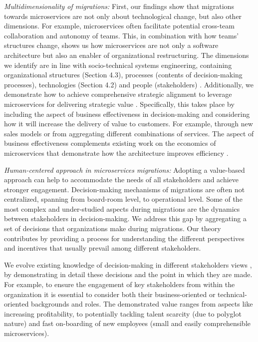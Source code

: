 \documentclass[sigconf,dvipsnames]{acmart}
\begin{document}
\emph{Multidimensionality of migrations:}
First, our findings show that migrations towards microservices are not only about technological change, but also other dimensions.
For example, microservices often facilitate potential cross-team collaboration and autonomy of teams. This, in combination with how teams' structures change, shows us how microservices are not only a software architecture but also an enabler of organizational restructuring.
The dimensions we identify are in line with socio-technical systems engineering, containing organizational structures (Section 4.3), processes (contents of decision-making processes), technologies (Section 4.2) and people (stakeholders) \cite{Baxter2011}. Additionally, we demonstrate how to achieve comprehensive strategic alignment to leverage microservices for delivering strategic value  \cite{Venkatraman1999}. Specifically, this takes place by including the aspect of business effectiveness \cite{Venkatraman1986} in decision-making and considering how it will increase the delivery of value to customers. For example, through new sales models or from aggregating different combinations of services. The aspect of business effectiveness complements existing work on the economics of microservices that demonstrate how the architecture improves efficiency \cite{singleton2016}.

\emph{Human-centered approach in microservices migrations:}
Adopting a value-based approach can help to accommodate the needs of all stakeholders and achieve stronger engagement.
Decision-making mechanisms of migrations are often not centralized, spanning from board-room level, to operational level.
Some of the most complex and under-studied aspects during migrations are the dynamics between stakeholders in decision-making.
We address this gap by aggregating a set of decisions that organizations make during migrations. Our theory contributes by providing a process for understanding the different perspectives and incentives that usually prevail among different stakeholders. 

We evolve existing knowledge of decision-making in different stakeholders views \cite{Kruchten2009}, by demonstrating in detail these decisions and the point in which they are made.
For example, to ensure the engagement of key stakeholders from within the organization it is essential to consider both their business-oriented or technical-oriented backgrounds and roles. 
The demonstrated value ranges from aspects like increasing profitability, to potentially tackling talent scarcity (due to polyglot nature) and fast on-boarding of new employees (small and easily comprehensible microservices). 
\end{document}
